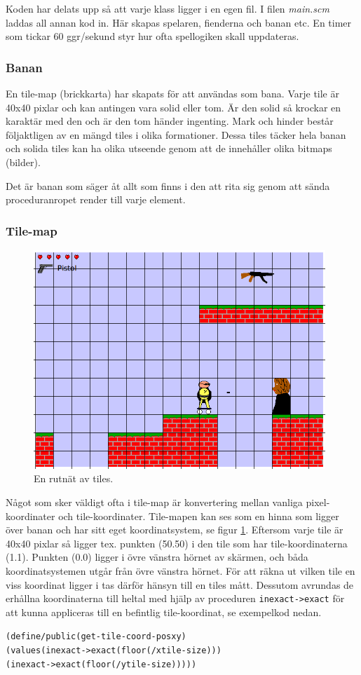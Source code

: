 \documentclass{scrartcl}
\newcommand{\code}[1]%
{\texttt{#1}}
\begin{document}
Koden har delats upp så att varje klass ligger i en egen fil. I filen \textsl{main.scm} laddas all annan kod in. Här skapas spelaren, fienderna och banan etc. En timer som tickar 60 ggr/sekund styr hur ofta spellogiken skall uppdateras. 

\subsubsection{Banan}
En tile-map (brickkarta) har skapats för att användas som bana. Varje tile är 40x40 pixlar och kan antingen vara solid eller tom. Är den solid så krockar en karaktär med den och är den tom händer ingenting. Mark och hinder består följaktligen av en mängd tiles i olika formationer. Dessa tiles täcker hela banan och solida tiles kan ha olika utseende genom att de innehåller olika bitmaps (bilder).

Det är banan som säger åt allt som finns i den att rita sig genom att sända proceduranropet render till varje element. 

\subsubsection{Tile-map}

\begin{figure}[h!]
\centering
\includegraphics[width=11cm]{tilekoordinater}
\caption{En rutnät av tiles.}\label{tile-rutnat}
\end{figure}

Något som sker väldigt ofta i tile-map är konvertering mellan vanliga pixel-koordinater och tile-koordinater. Tile-mapen kan ses som en hinna som ligger över banan och har sitt eget koordinatsystem, se figur \ref{tile-rutnat}. Eftersom varje tile är 40x40 pixlar så ligger tex. punkten (50.50) i den tile som har tile-koordinaterna (1.1). Punkten (0.0) ligger i övre vänstra hörnet av skärmen, och båda koordinatsystemen utgår från övre vänstra hörnet. För att räkna ut vilken tile en viss koordinat ligger i tas därför hänsyn till en tiles mått. Dessutom avrundas de erhållna koordinaterna till heltal med hjälp av proceduren \code{inexact->exact} för att kunna appliceras till en befintlig tile-koordinat, se exempelkod nedan. 
\begin{alltt}
(define/public (get-tile-coord-pos x y) 
      (values (inexact->exact (floor (/ x tile-size)))
              (inexact->exact (floor (/ y tile-size)))))
\end{alltt}         
\end{document}
